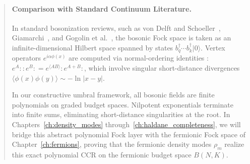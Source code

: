 \begin{quote}
\item[]\paragraph{Comparison with Standard Continuum Literature.}
In standard bosonization reviews, such as von Delft and Schoeller~\cite{vondelft1998}, Giamarchi~\cite{giamarchi2004}, and Gogolin et al.~\cite{gogolin1998}, the bosonic Fock space is taken as an infinite-dimensional Hilbert space spanned by states $b_q^\dagger \cdots b_k^\dagger |0\rangle$. Vertex operators $e^{i \alpha \phi(x)}$ are computed via normal-ordering identities :$e^A::e^B: = e^{\langle A B \rangle} :e^{A+B}:$, which involve singular short-distance divergences $\langle \phi(x) \phi(y) \rangle \sim -\ln|x-y|$.

In our constructive umbral framework, all bosonic fields are finite polynomials on graded budget spaces. Nilpotent exponentials terminate into finite sums, eliminating short-distance singularities at the root. In Chapters~\ref{ch:density_modes} through~\ref{ch:haldane_completeness}, we will bridge this abstract polynomial Fock layer with the fermionic Fock space of Chapter~\ref{ch:fermions}, proving that the fermionic density modes $\rho_m$ realize this exact polynomial CCR on the fermionic budget space $B(N, K)$.
\end{quote}
